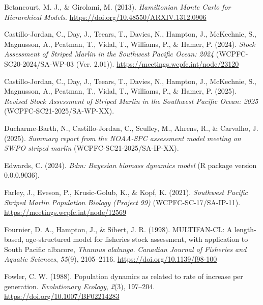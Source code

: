 \documentclass[
  11pt,
]{SCreport}
\newlength{\cslhangindent}
\newenvironment{CSLReferences}[2] %
 {\begin{list}{}{%
  \setlength{\itemindent}{0pt}
  \setlength{\leftmargin}{0pt}
  \setlength{\parsep}{0pt}
  \ifodd #1
   \setlength{\leftmargin}{\cslhangindent}
   \setlength{\itemindent}{-1\cslhangindent}
  \fi
  \setlength{\itemsep}{#2\baselineskip}}}
 {\end{list}}
\begin{document}
\label{refs}
\begin{CSLReferences}{1}{0}
Betancourt, M. J., \& Girolami, M. (2013). \emph{Hamiltonian {Monte}
{Carlo} for {Hierarchical} {Models}}.
\url{https://doi.org/10.48550/ARXIV.1312.0906}

Castillo-Jordan, C., Day, J., Teears, T., Davies, N., Hampton, J.,
McKechnie, S., Magnusson, A., Peatman, T., Vidal, T., Williams, P., \&
Hamer, P. (2024). \emph{Stock {Assessment} of {Striped} {Marlin} in the
{Southwest} {Pacific} {Ocean}: 2024} (WCPFC-SC20-2024/SA-WP-03 (Ver.
2.01)). \url{https://meetings.wcpfc.int/node/23120}

Castillo-Jordan, C., Day, J., Teears, T., Davies, N., Hampton, J.,
McKechnie, S., Magnusson, A., Peatman, T., Vidal, T., Williams, P., \&
Hamer, P. (2025). \emph{Revised {Stock} {Assessment} of {Striped}
{Marlin} in the {Southwest} {Pacific} {Ocean}: 2025}
(WCPFC-SC21-2025/SA-WP-XX).

Ducharme-Barth, N., Castillo-Jordan, C., Sculley, M., Ahrens, R., \&
Carvalho, J. (2025). \emph{Summary report from the {NOAA}-{SPC}
assessment model meeting on {SWPO} striped marlin}
(WCPFC-SC21-2025/SA-IP-XX).

Edwards, C. (2024). \emph{Bdm: {Bayesian} biomass dynamics model} (R
package version 0.0.0.9036).

Farley, J., Eveson, P., Krusic-Golub, K., \& Kopf, K. (2021).
\emph{Southwest {Pacific} {Striped} {Marlin} {Population} {Biology}
({Project} 99)} (WCPFC-SC-17/SA-IP-11).
\url{https://meetings.wcpfc.int/node/12569}

Fournier, D. A., Hampton, J., \& Sibert, J. R. (1998). {MULTIFAN}-{CL}:
A length-based, age-structured model for fisheries stock assessment,
with application to {South} {Pacific} albacore, \emph{{Thunnus}
alalunga}. \emph{Canadian Journal of Fisheries and Aquatic Sciences},
\emph{55}(9), 2105--2116. \url{https://doi.org/10.1139/f98-100}

Fowler, C. W. (1988). Population dynamics as related to rate of increase
per generation. \emph{Evolutionary Ecology}, \emph{2}(3), 197--204.
\url{https://doi.org/10.1007/BF02214283}


\end{CSLReferences}
\end{document}
